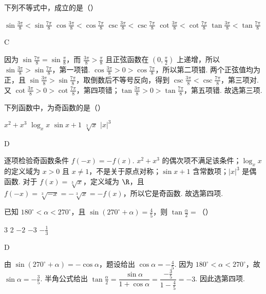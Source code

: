 \begin{problem}

下列不等式中，成立的是（\quad）

\choicesfive
    {\(\sin \frac{3\pi}{8} < \sin \frac{7\pi}{8}\)}
    {\(\cos \frac{3\pi}{8} < \cos \frac{7\pi}{8}\)}
    {\(\csc \frac{3\pi}{8} < \csc \frac{7\pi}{8}\)}
    {\(\cot \frac{3\pi}{8} < \cot \frac{7\pi}{8}\)}
    {\(\tan \frac{3\pi}{8} < \tan \frac{7\pi}{8}\)}
\begin{answer}
C
\end{answer}

\begin{solution}
因为 \(\sin\frac{7\pi}{8}=\sin\frac\pi8\)，而 \(\frac{3\pi}{8}>\frac\pi8\) 且正弦函数在 \(\left(0,\frac\pi2\right)\) 上递增，所以 \(\sin\frac{3\pi}{8}>\sin\frac{7\pi}{8}\)，第一项错.
\(\cos\frac{3\pi}{8}>0>\cos\frac{7\pi}{8}\)，所以第二项错. 两个正弦值均为正，且 \(\sin\frac{3\pi}{8}>\sin\frac{7\pi}{8}\)，取倒数后不等号反向，得到 \(\csc\frac{3\pi}{8}<\csc\frac{7\pi}{8}\)，第三项对.
又 \(\cot\frac{3\pi}{8}>0>\cot\frac{7\pi}{8}\)，第四项错；\(\tan\frac{3\pi}{8}>0>\tan\frac{7\pi}{8}\)，第五项错. 故选第三项.
\end{solution}
\end{problem}

\begin{problem}

下列函数中，为奇函数的是（\quad）

\choicesfive
    {\(x^{2} + x^{3}\)}
    {\(\log_{x}x\)}
    {\(\sin x + 1\)}
    {\(\sqrt[3]{x} \)}
    {\(|x|^{3} \)}
\begin{answer}
D
\end{answer}

\begin{solution}
逐项检验奇函数条件 \(f(-x)=-f(x)\). \(x^{2}+x^{3}\) 的偶次项不满足该条件；\(\log_xx\) 的定义域为 \(x>0\) 且 \(x\ne1\)，不是关于原点对称；\(\sin x+1\) 含常数项；\(|x|^{3}\) 是偶函数. 对于 \(f(x)=\sqrt[3]{x}\)，定义域为 \(\R\)，且 \(f(-x)=\sqrt[3]{-x}=-\sqrt[3]{x}=-f(x)\)，所以它是奇函数. 故选第四项.
\end{solution}
\end{problem}

\begin{problem}

已知 \(180^{\circ} < \alpha < 270^{\circ}\)，且 \(\sin (270^{\circ} + \alpha) = \frac{4}{5}\)，则 \(\tan \frac{\alpha}{2} =\)（\quad）

\choicesfive
    {3}
    {2}
    {\(-2\)}
    {\(-3\)}
    {\(-\frac{1}{3}\)}
\begin{answer}
D
\end{answer}

\begin{solution}
由 \(\sin(270^{\circ}+\alpha)=-\cos\alpha\)，题设给出 \(\cos\alpha=-\frac45\). 因为 \(180^{\circ}<\alpha<270^{\circ}\)，故 \(\sin\alpha=-\frac35\). 半角公式给出
\(\tan\frac\alpha2=\dfrac{\sin\alpha}{1+\cos\alpha}=\dfrac{-\frac{3}{5}}{1-\frac{4}{5}}=-3\). 因此选第四项.
\end{solution}
\end{problem}

